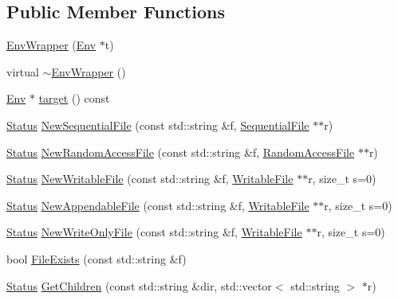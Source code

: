\subsection*{Public Member Functions}
\begin{DoxyCompactItemize}
\item 
\hyperlink{classleveldb_1_1_env_wrapper_a724d3740db2663034c8974c0378e49cb}{Env\+Wrapper} (\hyperlink{classleveldb_1_1_env}{Env} $\ast$t)
\item 
virtual \hyperlink{classleveldb_1_1_env_wrapper_a4bdf170510b585276e41671ae1910837}{$\sim$\+Env\+Wrapper} ()
\item 
\hyperlink{classleveldb_1_1_env}{Env} $\ast$ \hyperlink{classleveldb_1_1_env_wrapper_a7b147ba21760b3545e757abcdc6dd9c5}{target} () const 
\item 
\hyperlink{classleveldb_1_1_status}{Status} \hyperlink{classleveldb_1_1_env_wrapper_acd23f5803f7841cfcee9a29ffc1c5b04}{New\+Sequential\+File} (const std\+::string \&f, \hyperlink{classleveldb_1_1_sequential_file}{Sequential\+File} $\ast$$\ast$r)
\item 
\hyperlink{classleveldb_1_1_status}{Status} \hyperlink{classleveldb_1_1_env_wrapper_ab8c78959e0d52f3c1beeeffc11ca0a34}{New\+Random\+Access\+File} (const std\+::string \&f, \hyperlink{classleveldb_1_1_random_access_file}{Random\+Access\+File} $\ast$$\ast$r)
\item 
\hyperlink{classleveldb_1_1_status}{Status} \hyperlink{classleveldb_1_1_env_wrapper_a6ef642aa39f18a56ba6ed56e0ec5301f}{New\+Writable\+File} (const std\+::string \&f, \hyperlink{classleveldb_1_1_writable_file}{Writable\+File} $\ast$$\ast$r, size\+\_\+t s=0)
\item 
\hyperlink{classleveldb_1_1_status}{Status} \hyperlink{classleveldb_1_1_env_wrapper_a497520a246da303b7b8ff5d83779ce80}{New\+Appendable\+File} (const std\+::string \&f, \hyperlink{classleveldb_1_1_writable_file}{Writable\+File} $\ast$$\ast$r, size\+\_\+t s=0)
\item 
\hyperlink{classleveldb_1_1_status}{Status} \hyperlink{classleveldb_1_1_env_wrapper_a12700f6c498c9b475a1c68383b1ae318}{New\+Write\+Only\+File} (const std\+::string \&f, \hyperlink{classleveldb_1_1_writable_file}{Writable\+File} $\ast$$\ast$r, size\+\_\+t s=0)
\item 
bool \hyperlink{classleveldb_1_1_env_wrapper_ac72ceac6f4e2a6140e2835b2fa15f4df}{File\+Exists} (const std\+::string \&f)
\item 
\hyperlink{classleveldb_1_1_status}{Status} \hyperlink{classleveldb_1_1_env_wrapper_abb7c1fd7d91c80b6efcf9967154a18f3}{Get\+Children} (const std\+::string \&dir, std\+::vector$<$ std\+::string $>$ $\ast$r)
$$
\end{DoxyCompactItemize}
